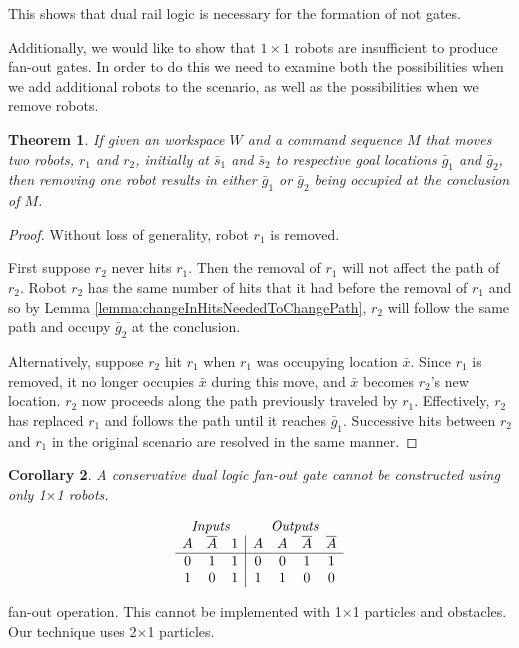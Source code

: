 \documentclass[letterpaper, 10 pt, conference]{ieeeconf}
\newtheorem{theorem}{Theorem}
\newtheorem{corollary}[theorem]{Corollary}
\begin{document}
This shows that dual rail logic is necessary for the formation of {\sc not} gates. 

Additionally, we would like to show that $1\times1$ robots are insufficient to produce fan-out gates. In order to do this we need to examine both the possibilities when we add additional robots to the scenario, as well as the possibilities when we remove robots.  

\begin{theorem}\label{thm:TwoRobotsTwoGoalsImpliesOneRobotOneGoal} 
If given an workspace $W$ and a command sequence $M$ that moves two robots, $r_1$ and $r_2$, initially at $\bar{s}_1$ and $\bar{s}_2$ to respective goal locations $\bar{g}_1$ and $\bar{g}_2$, then removing one robot results in either $\bar{g}_1$ or $\bar{g}_2$ being occupied at the conclusion of $M$.
\end{theorem}

\begin{proof} 
 Without loss of generality, robot $r_1$ is removed. 

First suppose $r_2$ never hits $r_1$. Then the removal of $r_1$ will not affect the path of $r_2$. Robot $r_2$ has the same number of hits that it had before the removal of $r_1$ and so by Lemma \ref{lemma:changeInHitsNeededToChangePath}, $r_2$ will follow the same path and occupy $\bar{g}_2$ at the conclusion. 

Alternatively, suppose $r_2$ hit $r_1$ when $r_1$ was occupying location $\bar{x}$. Since $r_1$ is removed, it no longer occupies $\bar{x}$ during this move, and $\bar{x}$ becomes $r_2$'s new location. $r_2$ now proceeds along the path previously traveled by $r_1$. Effectively, $r_2$ has replaced $r_1$ and follows the path until it reaches $\bar{g}_1$. Successive hits between $r_2$ and $r_1$ in the original scenario are resolved in the same manner.
\end{proof}

\begin{corollary}\label{cor:No1x1FanOut}
A  conservative dual logic {\sc fan-out} gate cannot be constructed using only 1$\times$1 robots.
\end{corollary}

  \begin{table}
\begin{displaymath}
\begin{array}{ccc|cccc}
\multicolumn{3}{c}{\emph{Inputs}} & \multicolumn{4}{c}{\emph{Outputs}} \\
   A & \overline{A} & 1 & A & A &  \overline{A} & \overline{A}\\
\hline
0 & 1 & 1 & 0 & 0 & 1 & 1  \\
1 & 0 & 1 & 1 & 1 & 0 & 0  \\
\end{array}
\end{displaymath}
\caption{{\sc fan-out} operation. This cannot be implemented with 1$\times$1 particles and obstacles. Our technique uses 2$\times$1 particles. }
  \label{tab:Fanout}
\end{table}
\end{document}
